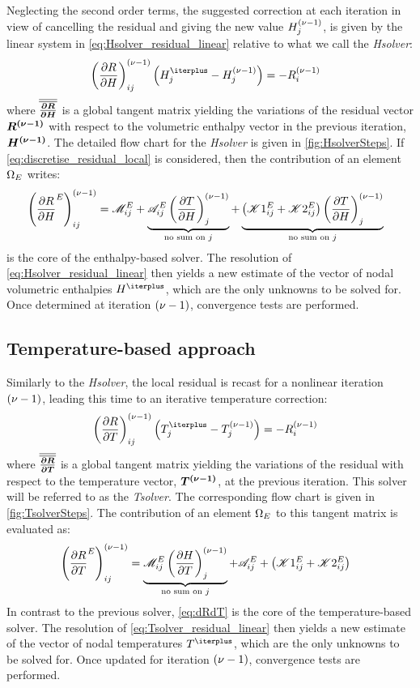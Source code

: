 Neglecting the second order terms, the suggested correction at each iteration in view of cancelling 
the residual and giving the new value $H_j^{{\left( \nu-1 \right)}}$, is given by the linear system in \cref{eq:Hsolver_residual_linear}
relative to what we call the \emph{Hsolver}:
\begin{align}
\label{eq:Hsolver_residual_linear}
& \brac{\dRdH}^{\iter}_{ij} \brac{\Hj^\iterplus - \Hj^\iter} = -R_i^\iter
\end{align}
where ${\overline{\overline{\boldsymbol{\frac{\partial R}{\partial H}}}}}$ is a global tangent matrix yielding the variations of the residual vector $\boldsymbol{R^{{\left( \nu-1 \right)}}}$ with respect to the volumetric enthalpy vector 
in the previous iteration, $\boldsymbol{H^{{\left( \nu-1 \right)}}}$. The detailed flow chart for the \emph{Hsolver} is given in \cref{fig:HsolverSteps}.
If \cref{eq:discretise_residual_local} is considered, then the contribution of an element $\Omega_E$ writes:
\begin{align}
\label{eq:dRdH}
& \left( \frac{\partial R}{\partial H}^E \right)^{{\left( \nu-1 \right)}}_{ij} 
= \mathscr{M}_{ij}^E 
+ \underbrace{\mathscr{A}_{ij}^E \left( \frac{\partial T}{\partial H} \right)^{{\left( \nu-1 \right)}}_{j}}_{\text{no sum on }j}
+ \underbrace{\left( \mathscr{K}1_{ij}^E + \mathscr{K}2_{ij}^E \right) \left( \frac{\partial T}{\partial H} \right)^{{\left( \nu-1 \right)}}_{j}}_{\text{no sum on }j}
\end{align}
 is the core of the enthalpy-based solver. The resolution of \cref{eq:Hsolver_residual_linear} 
then yields a new estimate of the vector of nodal volumetric enthalpies $H^\iterplus$, which are the only unknowns to be solved for. 
Once determined at iteration ${\left( \nu-1 \right)}$, convergence tests are performed.


\subsection{Temperature-based approach }

Similarly to the \emph{Hsolver}, the local residual is recast for a nonlinear iteration ${\left( \nu-1 \right)}$, 
leading this time to an iterative temperature correction:
\begin{align}
\label{eq:Tsolver_residual_linear}
& \brac{\dRdT}^\iter_{ij} \brac{\Tj^\iterplus - \Tj^\iter} = -R_i^\iter
\end{align}
where ${\overline{\overline{\boldsymbol{\frac{\partial R}{\partial T}}}}}$ is a global tangent matrix yielding the variations of the residual with respect to the temperature vector, $\boldsymbol{T^{{\left( \nu-1 \right)}}}$, at the previous iteration. 
This solver will be referred to as the \emph{Tsolver}. The corresponding flow chart is given in \cref{fig:TsolverSteps}.
The contribution of an element $\Omega_E$ to this tangent matrix is evaluated as:
\begin{align}
\label{eq:dRdT}
& \left( \frac{\partial R}{\partial T}^E \right)^{{\left( \nu-1 \right)}}_{ij}
= \underbrace{\mathscr{M}_{ij}^E \left( \frac{\partial H}{\partial T} \right)^{{\left( \nu-1 \right)}}_{j}}_{\text{no sum on }j}
+ \mathscr{A}_{ij}^E
+ \left( \mathscr{K}1_{ij}^E + \mathscr{K}2_{ij}^E \right)
\end{align}
In contrast to the previous solver, \cref{eq:dRdT} is the core of the temperature-based solver. The resolution of \cref{eq:Tsolver_residual_linear} 
then yields a new estimate of the vector of nodal temperatures $T^\iterplus$, which are the only unknowns to be solved for. 
Once updated for iteration ${\left( \nu-1 \right)}$, convergence tests are performed.
%
%
